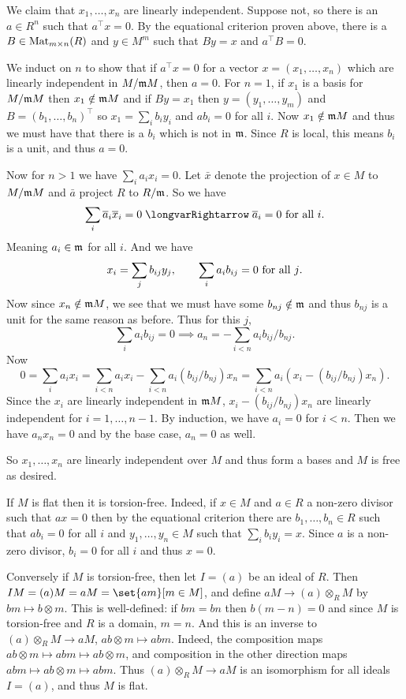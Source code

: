     We claim that $x_1,\dots,x_n$ are linearly independent.
    Suppose not, so there is an $a\in R^n$ such that $a^\top x=0$.
    By the equational criterion proven above, there is a $B\in{\rm Mat}_{m\times n}(R)$ and $y\in M^m$ such that $By=x$ and $a^\top B=0$.

    We induct on $n$ to show that if $a^\top x=0$ for a vector $x=(x_1,\dots,x_n)$ which are linearly independent in $M/{{\frak m}} M$, then $a=0$.
    For $n=1$, if $x_1$ is a basis for $M/{{\frak m}} M$ then $x_1\notin{{\frak m}} M$ and if $By=x_1$ then $y=(y_1,\dots,y_m)$ and $B=(b_1,\dots,b_n)^\top$ so
    $x_1=\sum_ib_iy_i$ and $ab_i=0$ for all $i$.
    Now $x_1\notin{{\frak m}} M$ and thus we must have that there is a $b_i$ which is not in ${{\frak m}}$.
    Since $R$ is local, this means $b_i$ is a unit, and thus $a=0$.

    Now for $n>1$ we have $\sum_ia_ix_i=0$.
    Let $\bar x$ denote the projection of $x\in M$ to $M/{{\frak m}} M$ and $\bar a$ project $R$ to $R/{{\frak m}}$.
    So we have
    $$ \sum_i\bar a_i\bar x_i = 0 \implies \bar a_i = 0 \hbox{ for all $i$}. $$
    Meaning $a_i\in{{\frak m}}$ for all $i$.
    And we have
    $$ x_i = \sum_j b_{ij}y_j,\qquad \sum_i a_ib_{ij} = 0 \hbox{ for all $j$}. $$
    Now since $x_n\notin{{\frak m}} M$, we see that we must have some $b_{nj}\notin{{\frak m}}$ and thus $b_{nj}$ is a unit for the same reason as before.
    Thus for this $j$,
    $$ \sum_i a_ib_{ij} = 0 \implies a_n = -\sum_{i<n}a_ib_{ij}/b_{nj} . $$
    Now
    $$ 0 = \sum_i a_ix_i = \sum_{i<n}a_ix_i - \sum_{i<n}a_i(b_{ij}/b_{nj})x_n = \sum_{i<n}a_i(x_i-(b_{ij}/b_{nj})x_n) . $$
    Since the $x_i$ are linearly independent in ${{\frak m}} M$, $x_i-(b_{ij}/b_{nj})x_n$ are linearly independent for $i=1,\dots,n-1$.
    By induction, we have $a_i=0$ for $i<n$.
    Then we have $a_nx_n=0$ and by the base case, $a_n=0$ as well.

    So $x_1,\dots,x_n$ are linearly independent over $M$ and thus form a bases and $M$ is free as desired.

    \item If $M$ is flat then it is torsion-free.
    Indeed, if $x\in M$ and $a\in R$ a non-zero divisor such that $ax=0$ then by the equational criterion there are $b_1,\dots,b_n\in R$ such that $ab_i=0$ for all
    $i$ and $y_1,\dots,y_n\in M$ such that $\sum_ib_iy_i=x$.
    Since $a$ is a non-zero divisor, $b_i=0$ for all $i$ and thus $x=0$.

    Conversely if $M$ is torsion-free, then let $I=(a)$ be an ideal of $R$.
    Then $IM=(a)M=aM=\set{am}[m\in M]$, and define $aM\to (a)\otimes_RM$ by $bm\mapsto b\otimes m$.
    This is well-defined: if $bm=bn$ then $b(m-n)=0$ and since $M$ is torsion-free and $R$ is a domain, $m=n$.
    And this is an inverse to $(a)\otimes_RM\to aM$, $ab\otimes m\mapsto abm$.
    Indeed, the composition maps $ab\otimes m\mapsto abm\mapsto ab\otimes m$, and composition in the other direction maps $abm\mapsto ab\otimes m\mapsto abm$.
    Thus $(a)\otimes_RM\to aM$ is an isomorphism for all ideals $I=(a)$, and thus $M$ is flat.

